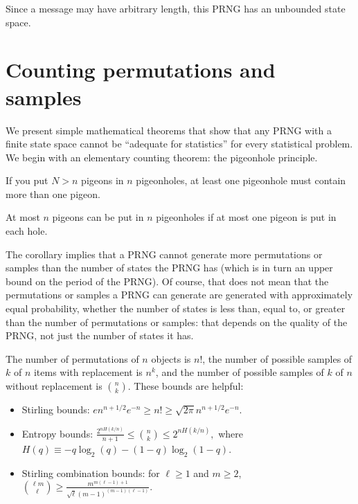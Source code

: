 \documentclass[graybox]{svmult}
\begin{document}
Since a message may have arbitrary length, this PRNG has an unbounded state space.

\section{Counting permutations and samples}
\label{sec:count}

We present simple mathematical theorems that show that any PRNG with a finite state space
cannot be ``adequate for statistics'' for every statistical problem.
We begin with an elementary counting theorem: the pigeonhole principle.

\begin{theorem}
If you put $N>n$ pigeons in $n$ pigeonholes, at least one
pigeonhole must contain more than one pigeon.
\end{theorem}

\begin{corollary}
At most $n$ pigeons can be put in $n$ pigeonholes if at most
one pigeon is put in each hole.
\end{corollary}

The corollary implies that a PRNG cannot generate more permutations or samples than the number of states the PRNG has (which is in turn an upper bound on the period of the PRNG).
Of course, that does not mean that the permutations or samples a PRNG can generate are generated with approximately equal probability, whether the number of states is less than, equal to, or greater than the number of
permutations or samples: that depends on the quality of the PRNG, not just the number of states it has.

The number of permutations of $n$ objects is $n!$, the number of possible samples of $k$ of $n$ items
with replacement is $n^k$,  and the number of possible samples of $k$ of $n$ without replacement is $n \choose k$.
These bounds are helpful:
\begin{itemize}
\item Stirling bounds: $ e n^{n+1/2} e^{-n} \ge n! \ge \sqrt{2 \pi} n^{n+1/2} e^{-n}.$
\item Entropy bounds:
$ \frac{2^{nH(k/n)}}{n+1} \le {n \choose k} \le 2^{nH(k/n)},$ where $H(q) \equiv -q \log_2(q) - (1-q) \log_2 (1-q)$.
\item Stirling combination bounds:
for $\ell \ge 1$ and $m \ge 2$, $ { {\ell m } \choose { \ell }} \ge \frac{m^{m(\ell-1)+1}}{\sqrt{\ell} (m-1)^{(m-1)(\ell-1)}}. $
\end{itemize}
\end{document}
